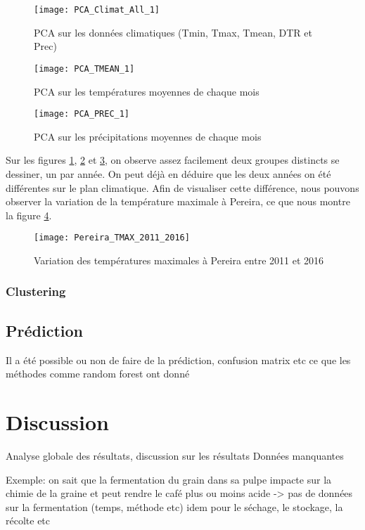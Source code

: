 \begin{figure}[H]
	\texttt{[image: PCA\_Climat\_All\_1]}
	\caption{\label{PCAClimatAll} PCA sur les données climatiques (Tmin, Tmax, Tmean, DTR et Prec) }
\end{figure}

\begin{figure}[H]
	\texttt{[image: PCA\_TMEAN\_1]}
	\caption{\label{PCAClimatTmean} PCA sur les températures moyennes de chaque mois }
\end{figure}

\begin{figure}[H]
	\texttt{[image: PCA\_PREC\_1]}
	\caption{\label{PCAClimatPrec} PCA sur les précipitations moyennes de chaque mois }
\end{figure}


Sur les figures \ref{PCAClimatAll}, \ref{PCAClimatTmean} et \ref{PCAClimatPrec}, on observe assez facilement deux groupes distincts se dessiner, un par année. On peut déjà en déduire que les deux années on été différentes sur le plan climatique. Afin de visualiser cette différence, nous pouvons observer la variation de la température maximale à Pereira, ce que nous montre la figure \ref{Tmax_Pereira}.

\begin{figure}[H]
	\texttt{[image: Pereira\_TMAX\_2011\_2016]}
	\caption{\label{Tmax_Pereira} Variation des températures maximales à Pereira entre 2011 et 2016}
\end{figure}




\subsection{Clustering}





\section{Prédiction}
Il a été possible ou non de faire de la prédiction, confusion matrix etc
ce que les méthodes comme random forest ont donné


\chapter{Discussion}
Analyse globale des résultats, discussion sur les résultats 
Données manquantes

Exemple: on sait que la fermentation du grain dans sa pulpe impacte sur la chimie de la graine et peut rendre le café plus ou moins acide -> pas de données sur la fermentation (temps, méthode etc) idem pour le séchage, le stockage, la récolte etc
